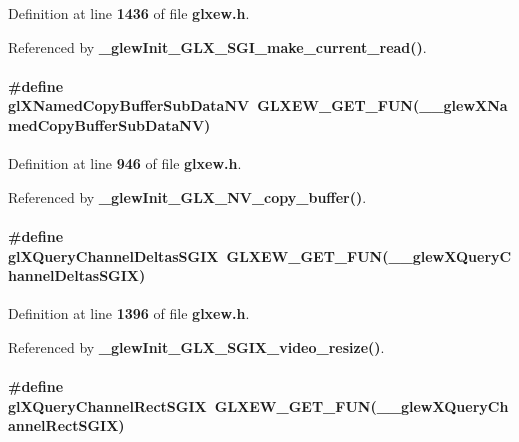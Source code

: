 Definition at line {\bf 1436} of file {\bf glxew.\+h}.



Referenced by {\bf \+\_\+glew\+Init\+\_\+\+G\+L\+X\+\_\+\+S\+G\+I\+\_\+make\+\_\+current\+\_\+read()}.

\paragraph[{gl\+X\+Named\+Copy\+Buffer\+Sub\+Data\+NV}]{\setlength{\rightskip}{0pt plus 5cm}\#define gl\+X\+Named\+Copy\+Buffer\+Sub\+Data\+NV~{\bf G\+L\+X\+E\+W\+\_\+\+G\+E\+T\+\_\+\+F\+UN}({\bf \+\_\+\+\_\+glew\+X\+Named\+Copy\+Buffer\+Sub\+Data\+NV})}\label{glxew_8h_adbc085d54f3a7cc43875f09a210df5cf}


Definition at line {\bf 946} of file {\bf glxew.\+h}.



Referenced by {\bf \+\_\+glew\+Init\+\_\+\+G\+L\+X\+\_\+\+N\+V\+\_\+copy\+\_\+buffer()}.

\paragraph[{gl\+X\+Query\+Channel\+Deltas\+S\+G\+IX}]{\setlength{\rightskip}{0pt plus 5cm}\#define gl\+X\+Query\+Channel\+Deltas\+S\+G\+IX~{\bf G\+L\+X\+E\+W\+\_\+\+G\+E\+T\+\_\+\+F\+UN}({\bf \+\_\+\+\_\+glew\+X\+Query\+Channel\+Deltas\+S\+G\+IX})}\label{glxew_8h_a112f862437fd4904271f57653f6097a6}


Definition at line {\bf 1396} of file {\bf glxew.\+h}.



Referenced by {\bf \+\_\+glew\+Init\+\_\+\+G\+L\+X\+\_\+\+S\+G\+I\+X\+\_\+video\+\_\+resize()}.

\paragraph[{gl\+X\+Query\+Channel\+Rect\+S\+G\+IX}]{\setlength{\rightskip}{0pt plus 5cm}\#define gl\+X\+Query\+Channel\+Rect\+S\+G\+IX~{\bf G\+L\+X\+E\+W\+\_\+\+G\+E\+T\+\_\+\+F\+UN}({\bf \+\_\+\+\_\+glew\+X\+Query\+Channel\+Rect\+S\+G\+IX})}\label{glxew_8h_ae606c4512001b06d348cbabfc79fe95e}


